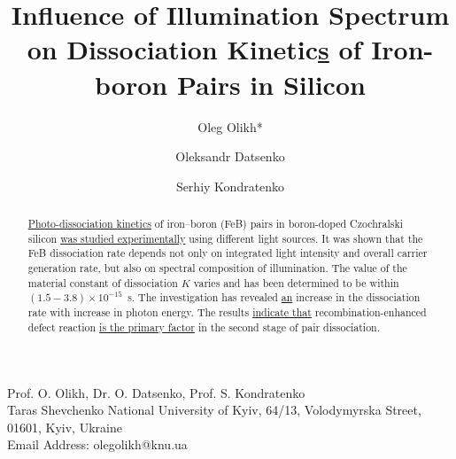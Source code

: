 \documentclass{WileyMSP-template}
\begin{document}
\pagestyle{fancy}


\title{Influence of Illumination Spectrum on Dissociation Kinetic\textcolor[rgb]{0.00,0.07,1.00}{\uline{s}} of Iron-boron Pairs in Silicon}

\maketitle




\author{Oleg Olikh*}
\author{Oleksandr Datsenko}
\author{Serhiy Kondratenko}


\dedication{}






\begin{affiliations}
Prof. O. Olikh, Dr. O. Datsenko, Prof. S. Kondratenko\\
Taras Shevchenko National University of Kyiv, 64/13, Volodymyrska Street, 01601, Kyiv, Ukraine\\
Email Address: olegolikh@knu.ua


\end{affiliations}






\begin{abstract}

\textcolor[rgb]{0.00,0.07,1.00}{\uline{Photo-dissociation kinetics}} of iron–boron (FeB) pairs
in boron-doped Czochralski silicon \textcolor[rgb]{0.00,0.07,1.00}{\uline{was studied experimentally}} using different light sources.
It was shown that the FeB dissociation rate depends not only on integrated light intensity
and overall carrier generation rate, but also on spectral composition of illumination.
The value of the material constant of dissociation $K$ varies and has been determined to be within $(1.5-3.8)\times10^{-15}$~s.
The investigation has revealed \textcolor[rgb]{0.00,0.07,1.00}{\uline{an}} increase in the dissociation rate with increase in photon energy.
The results \textcolor[rgb]{0.00,0.07,1.00}{\uline{indicate that}} recombination-enhanced defect reaction \textcolor[rgb]{0.00,0.07,1.00}{\uline{is the primary factor}} in the second stage of pair dissociation.

\end{abstract}
\end{document}
